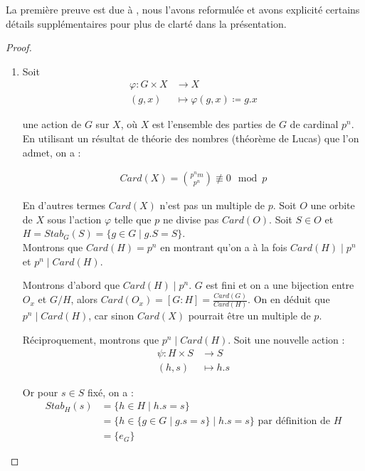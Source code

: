 \documentclass{article}
\theoremstyle{definition}
\theoremstyle{plain}
\theoremstyle{plain}
\theoremstyle{plain}
\theoremstyle{plain}
\theoremstyle{plain}
\theoremstyle{definition}
\theoremstyle{plain}
\theoremstyle{plain}
\begin{document}
\par La première preuve est due à \cite[p.~216-218]{chen2024napkin}, nous l'avons reformulée et avons explicité certains détails supplémentaires pour plus de clarté dans la présentation.
\begin{proof}
	\begin{enumerate}[label={\upshape(\roman*)}]
		\item 
Soit
\begin{align*}
	\varphi : G \times X &\to X \\
	(g,x) &\mapsto \varphi(g,x) \coloneq g.x
\end{align*}

une action de \( G \) sur \( X \), où \( X \) est l'ensemble des parties de \( G \) de cardinal \( p^{n} \). En utilisant un résultat de théorie des nombres (théorème de Lucas) que l'on admet, on a :

\begin{align*}
	Card(X) = \binom{p^{n}m}{p^{n}} \not\equiv 0 \mod  p 
\end{align*}


En d'autres termes \( Card(X) \) n'est pas un multiple de \( p \).
Soit \( O \) une orbite de \( X \) sous l'action \( \varphi \) telle que \( p \) ne divise pas \( Card(O) \). Soit \( S \in O \) et \( H = Stab_{G}({S}) = \{ g \in G \mid g.S = S \} \). \\
Montrons que \( Card(H) = p^{n} \) en montrant qu'on a à la fois \( Card(H) \mid p^{n} \) et \( p^{n} \mid Card(H) \).

\par Montrons d'abord que \( Card(H) \mid p^{n} \). \( G \) est fini et on a une bijection entre \( O_x \) et \( G/H \), alors \( Card(O_{x}) = [G : H]  = \frac{Card(G)}{Card(H)} \).
On en déduit que \( p^{n} \mid Card(H) \), car sinon \( Card(X) \) pourrait être un multiple de \( p \).

\par Réciproquement, montrons que \( p^{n} \mid Card(H) \). Soit une nouvelle action :
\begin{align*}
	\psi : H \times S &\to S \\
	(h,s) &\mapsto h.s
\end{align*}

Or pour \( s \in S \) fixé, on a :
\begin{align*}
	Stab_{H}({s}) &= \{ h \in H \mid h.s = s \} \\ 
		      &= \{ h \in \{g \in G \mid g.s = s \} \mid h.s = s \} \text{ par définition de } H\\
	&= \{e_{G}\} 
\end{align*}



\end{enumerate}
\end{proof}
\end{document}
